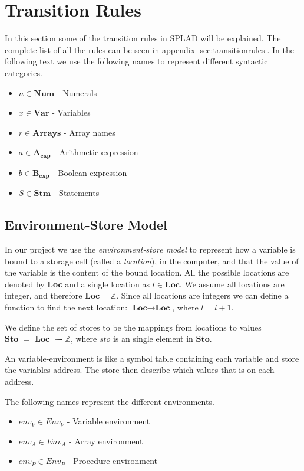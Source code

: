 

\section{Transition Rules}
In this section some of the transition rules in SPLAD will be explained. The complete list of all the rules can be seen in appendix \ref{sec:transitionrules}.
In the following text we use the following names to represent different syntactic categories.
\begin{itemize}
\item $n \in \textbf{Num}$ - Numerals
\item $x \in \textbf{Var}$ - Variables 
\item $r \in \textbf{Arrays}$ - Array names
\item $a \in \mathbf{A_{exp}}$ - Arithmetic expression
\item $b \in \mathbf{B_{exp}}$ - Boolean expression
\item $S \in \textbf{Stm}$ - Statements
\end{itemize}

\subsection{Environment-Store Model}
In our project we use the \textit{environment-store model} to represent how a variable is bound to a storage cell (called a \textit{location}), in the computer, and that the value of the variable is the content of the bound location. All the possible locations are denoted by \textbf{Loc} and a single location as $l \in \textbf{Loc}$. We assume all locations are integer, and therefore $\textbf{Loc} = \mathbb{Z}$. Since all locations are integers we can define a function to find the next location: $\textbf{Loc} \rightarrow \textbf{Loc}$, where $l = l + 1$. 

We define the set of stores to be the mappings from locations to values $\textbf{Sto } = \textbf{ Loc } \rightharpoonup \mathbb{Z}$, where $sto$ is an single element in $\textbf{Sto}$.

An variable-environment is like a symbol table containing each variable and store the variables address. The store then describe which values that is on each address.

The following names represent the different environments. 
\begin{itemize}
\item $env_V \in Env_V$ - Variable environment
\item $env_A \in Env_A$ - Array environment
\item $env_P \in Env_P$ - Procedure environment
\end{itemize}

